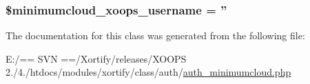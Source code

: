 \hypertarget{class_xortify_auth_minimum_cloud_a43e053bc7e50dc0203616ef89c3fb392}{
\subsubsection[{\$minimumcloud\-\_\-xoops\-\_\-username}]{\setlength{\rightskip}{0pt plus 5cm}\$minimumcloud\-\_\-xoops\-\_\-username = ''}}\label{class_xortify_auth_minimum_cloud_a43e053bc7e50dc0203616ef89c3fb392}


The documentation for this class was generated from the following file\-:\begin{DoxyCompactItemize}
\item 
E\-:/== S\-V\-N ==/\-Xortify/releases/\-X\-O\-O\-P\-S 2./4./htdocs/modules/xortify/class/auth/\hyperlink{auth__minimumcloud_8php}{auth\-\_\-minimumcloud.\-php}\end{DoxyCompactItemize}
